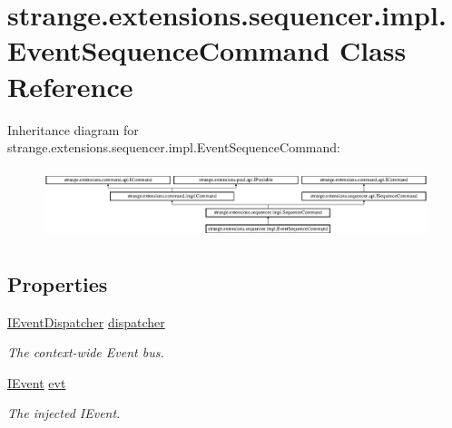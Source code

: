 \hypertarget{classstrange_1_1extensions_1_1sequencer_1_1impl_1_1_event_sequence_command}{\section{strange.\-extensions.\-sequencer.\-impl.\-Event\-Sequence\-Command Class Reference}
\label{classstrange_1_1extensions_1_1sequencer_1_1impl_1_1_event_sequence_command}
}
Inheritance diagram for strange.\-extensions.\-sequencer.\-impl.\-Event\-Sequence\-Command\-:\begin{figure}[H]
\begin{center}
\leavevmode
\includegraphics[height=2.068329cm]{classstrange_1_1extensions_1_1sequencer_1_1impl_1_1_event_sequence_command}
\end{center}
\end{figure}
\subsection*{Properties}
\begin{DoxyCompactItemize}
\item 
\hypertarget{classstrange_1_1extensions_1_1sequencer_1_1impl_1_1_event_sequence_command_a3b0bd45295ae480feb228090153e4aa4}{\hyperlink{interfacestrange_1_1extensions_1_1dispatcher_1_1eventdispatcher_1_1api_1_1_i_event_dispatcher}{I\-Event\-Dispatcher} \hyperlink{classstrange_1_1extensions_1_1sequencer_1_1impl_1_1_event_sequence_command_a3b0bd45295ae480feb228090153e4aa4}{dispatcher}}\label{classstrange_1_1extensions_1_1sequencer_1_1impl_1_1_event_sequence_command_a3b0bd45295ae480feb228090153e4aa4}

\begin{DoxyCompactList}\small\item\em The context-\/wide Event bus. \end{DoxyCompactList}\item 
\hypertarget{classstrange_1_1extensions_1_1sequencer_1_1impl_1_1_event_sequence_command_a9299b7ee26623269418a2f54b4158101}{\hyperlink{interfacestrange_1_1extensions_1_1dispatcher_1_1eventdispatcher_1_1api_1_1_i_event}{I\-Event} \hyperlink{classstrange_1_1extensions_1_1sequencer_1_1impl_1_1_event_sequence_command_a9299b7ee26623269418a2f54b4158101}{evt}}\label{classstrange_1_1extensions_1_1sequencer_1_1impl_1_1_event_sequence_command_a9299b7ee26623269418a2f54b4158101}

\begin{DoxyCompactList}\small\item\em The injected I\-Event. \end{DoxyCompactList}\end{DoxyCompactItemize}
